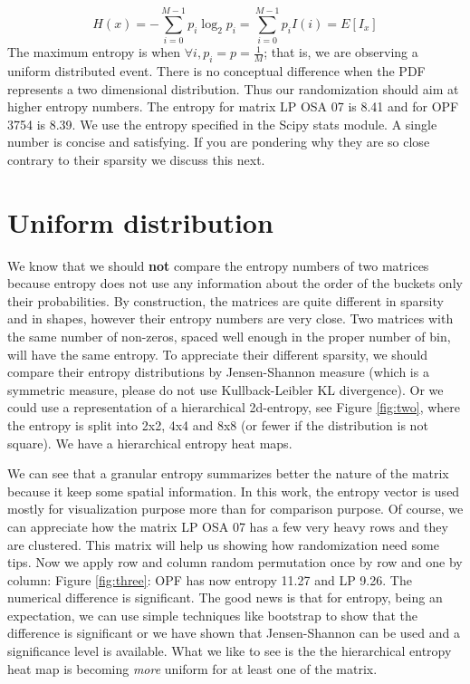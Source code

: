 \documentclass[manuscript,screen]{acmart}
\begin{document}
\begin{equation}
  \label{eq:entropy}
  H(x) = -\sum_{i=0}^{M-1} p_i\log_2p_i = \sum_{i=0}^{M-1}p_i I(i) =
  E[I_x]
\end{equation}
The maximum entropy is when $\forall i, p_i = p = \frac{1}{M}$; that
is, we are observing a uniform distributed event. There is no
conceptual difference when the PDF represents a two dimensional
distribution. Thus our randomization should aim at higher entropy
numbers. The entropy for matrix LP OSA 07 is 8.41 and for OPF 3754 is
8.39. We use the entropy specified in the Scipy stats module.  A
single number is concise and satisfying. If you are pondering why they
are so close contrary to their sparsity we discuss this next.


\section{Uniform distribution}
\label{sec:uniform}
We know that we should {\bf not} compare the entropy numbers of two
matrices because entropy does not use any information about the order
of the buckets only their probabilities. By construction, the matrices
are quite different in sparsity and in shapes, however their entropy
numbers are very close.  Two matrices with the same number of
non-zeros, spaced well enough in the proper number of bin, will have
the same entropy. To appreciate their different sparsity, we should
compare their entropy distributions by Jensen-Shannon measure (which
is a symmetric measure, please do not use Kullback-Leibler KL
divergence). Or we could use a representation of a hierarchical
2d-entropy, see Figure \ref{fig:two}, where the entropy is split into
2x2, 4x4 and 8x8 (or fewer if the distribution is not square). We have
a hierarchical entropy heat maps.


We can see that a granular entropy summarizes better the nature of the
matrix because it keep some spatial information. In this work, the
entropy vector is used mostly for visualization purpose more than for
comparison purpose. Of course, we can appreciate how the matrix LP OSA
07 has a few very heavy rows and they are clustered. This matrix will
help us showing how randomization need some tips. Now we apply row and
column random permutation once by row and one by column: Figure
\ref{fig:three}: OPF has now entropy 11.27 and LP 9.26. The numerical
difference is significant. The good news is that for entropy, being an
expectation, we can use simple techniques like bootstrap to show that
the difference is significant or we have shown that Jensen-Shannon can
be used and a significance level is available. What we like to see is
the the hierarchical entropy heat map is becoming {\em more} uniform
for at least one of the matrix.
\end{document}
